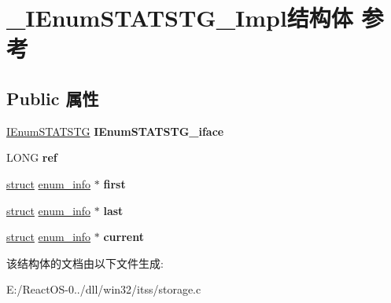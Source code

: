 \hypertarget{struct___i_enum_s_t_a_t_s_t_g___impl}{}\section{\+\_\+\+I\+Enum\+S\+T\+A\+T\+S\+T\+G\+\_\+\+Impl结构体 参考}
\label{struct___i_enum_s_t_a_t_s_t_g___impl}
\subsection*{Public 属性}
\begin{DoxyCompactItemize}
\item 
\mbox{\label{struct___i_enum_s_t_a_t_s_t_g___impl_a6f28b3bd898463d009c6d0c5e6174c99}} 
\hyperlink{interface_i_enum_s_t_a_t_s_t_g}{I\+Enum\+S\+T\+A\+T\+S\+TG} {\bfseries I\+Enum\+S\+T\+A\+T\+S\+T\+G\+\_\+iface}
\item 
\mbox{\label{struct___i_enum_s_t_a_t_s_t_g___impl_ae624e800c3b6107755b64f2fcbae1f4c}} 
L\+O\+NG {\bfseries ref}
\item 
\mbox{\label{struct___i_enum_s_t_a_t_s_t_g___impl_a841f45470bfb035dff7fd2448b21f7fa}} 
\hyperlink{interfacestruct}{struct} \hyperlink{structenum__info}{enum\+\_\+info} $\ast$ {\bfseries first}
\item 
\mbox{\label{struct___i_enum_s_t_a_t_s_t_g___impl_a8cc33715609df2c6408a822fa47208e6}} 
\hyperlink{interfacestruct}{struct} \hyperlink{structenum__info}{enum\+\_\+info} $\ast$ {\bfseries last}
\item 
\mbox{\label{struct___i_enum_s_t_a_t_s_t_g___impl_a266a4e58954ed2a6735689ccde5169fc}} 
\hyperlink{interfacestruct}{struct} \hyperlink{structenum__info}{enum\+\_\+info} $\ast$ {\bfseries current}
\end{DoxyCompactItemize}


该结构体的文档由以下文件生成\+:\begin{DoxyCompactItemize}
\item 
E\+:/\+React\+O\+S-\/0../dll/win32/itss/storage.\+c\end{DoxyCompactItemize}
